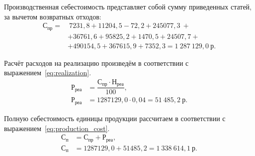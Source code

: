 Производственная себестоимость представляет собой сумму приведенных статей, за
вычетом возвратных отходов:
\begin{align}
  \text{С}_{\text{пр}} =&~7231{,}8 + 11204{,}5 - 72{,}2 + 245077{,}3~ + \\ \nonumber
    &+ 36761,{6} + 95825{,}2 + 1470{,}5 + 24507{,}7 +             \\ \nonumber
    &+ 490154{,}5 + 367615{,}9 + 7352{,}3 = 1~287~129{,}0 \: \text{р.} \nonumber
\end{align}

Расчёт расходов на реализацию произведём в соответствии с
выражением~\ref{eq:realization}.
\begin{align}
  \label{eq:realization}
  \text{Р}_{\text{реа}} &= \dfrac{\text{С}_{\text{пр}} \cdot
    \text{Н}_{\text{реа}}}{100}, \\
  \text{Р}_{\text{реа}} &= 1287129{,}0 \cdot 0{,}04 =
    51~485{,}2 \: \text{р.} \nonumber
\end{align}

Полную себестоимость единицы продукции рассчитаем в соответствии с
выражением~\ref{eq:production_cost}.
\begin{align}
  \label{eq:production_cost}
  \text{С}_{\text{п}} &= \text{С}_{\text{пр}} + \text{Р}_{\text{реа}}, \\
  \text{С}_{\text{п}} &= 1287129{,}0 + 51485{,}2 =
    1~338~614{,}1 \: \text{р.} \nonumber
\end{align}

\newpage

